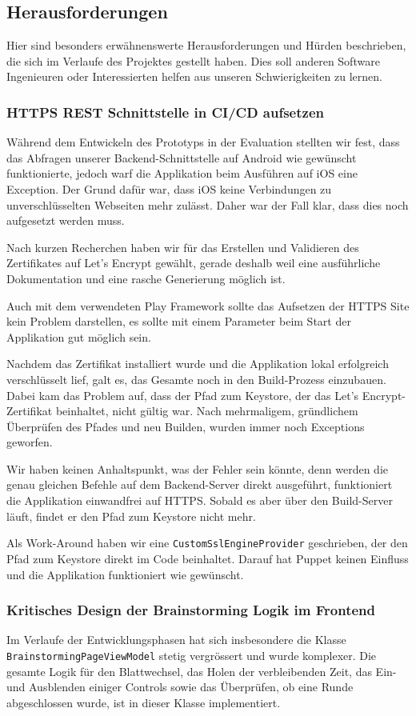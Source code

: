 \subsection{Herausforderungen}
Hier sind besonders erwähnenswerte Herausforderungen und Hürden beschrieben, die sich im Verlaufe des Projektes gestellt haben. Dies soll anderen Software Ingenieuren oder Interessierten helfen  aus unseren Schwierigkeiten zu lernen. 

\subsubsection{HTTPS REST Schnittstelle in CI/CD aufsetzen}
Während dem Entwickeln des Prototyps in der Evaluation stellten wir fest, dass das Abfragen unserer Backend-Schnittstelle auf Android wie gewünscht funktionierte, jedoch warf die Applikation beim Ausführen auf iOS eine Exception. Der Grund dafür war, dass iOS keine Verbindungen zu unverschlüsselten Webseiten mehr zulässt. Daher war der Fall klar, dass dies noch aufgesetzt werden muss.

Nach kurzen Recherchen haben wir für das Erstellen und Validieren des Zertifikates auf Let's Encrypt \cite{letsencrypt} gewählt, gerade deshalb weil eine ausführliche Dokumentation und eine rasche Generierung möglich ist. 

Auch mit dem verwendeten Play Framework sollte das Aufsetzen der HTTPS Site kein Problem darstellen, es sollte mit einem Parameter beim Start der Applikation gut möglich sein. 

Nachdem das Zertifikat installiert wurde und die Applikation lokal erfolgreich verschlüsselt lief, galt es, das Gesamte noch in den Build-Prozess einzubauen. Dabei kam das Problem auf, dass der Pfad zum Keystore, der das Let's Encrypt-Zertifikat beinhaltet, nicht gültig war. Nach mehrmaligem, gründlichem Überprüfen des Pfades und neu Builden, wurden immer noch Exceptions geworfen.

Wir haben keinen Anhaltspunkt, was der Fehler sein könnte, denn werden die genau gleichen Befehle auf dem Backend-Server direkt ausgeführt, funktioniert die Applikation einwandfrei auf HTTPS. Sobald es aber über den Build-Server läuft, findet er den Pfad zum Keystore nicht mehr.

Als Work-Around haben wir eine \texttt{CustomSslEngineProvider} geschrieben, der den Pfad zum Keystore direkt im Code beinhaltet. Darauf hat Puppet keinen Einfluss und die Applikation funktioniert wie gewünscht.

\subsubsection{Kritisches Design der Brainstorming Logik im Frontend}\label{subsub:design-issue}
Im Verlaufe der Entwicklungsphasen hat sich insbesondere die Klasse \texttt{Brain\-storming\-PageViewModel} stetig vergrössert und wurde komplexer. Die gesamte Logik für den Blattwechsel, das Holen der verbleibenden Zeit, das Ein- und Ausblenden einiger Controls sowie das Überprüfen, ob eine Runde abgeschlossen wurde, ist in dieser Klasse implementiert. 

